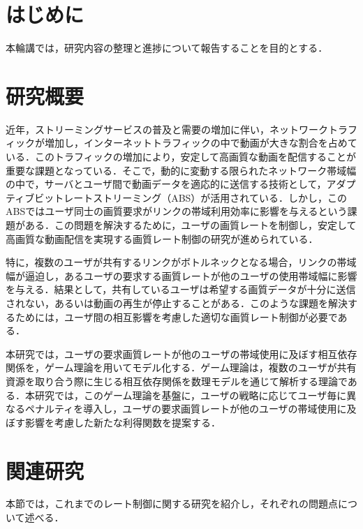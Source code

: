 \documentclass[rinkou,a4paper,uplatex]{ieicej}
\begin{document}
\maketitle
\section{はじめに}
本輪講では，研究内容の整理と進捗について報告することを目的とする．

\section{研究概要}
近年，ストリーミングサービスの普及と需要の増加に伴い，ネットワークトラフィックが増加し，インターネットトラフィックの中で動画が大きな割合を占めている．このトラフィックの増加により，安定して高画質な動画を配信することが重要な課題となっている．そこで，動的に変動する限られたネットワーク帯域幅の中で，サーバとユーザ間で動画データを適応的に送信する技術として，アダプティブビットレートストリーミング（ABS）が活用されている．しかし，このABSではユーザ同士の画質要求がリンクの帯域利用効率に影響を与えるという課題がある．この問題を解決するために，ユーザの画質レートを制御し，安定して高画質な動画配信を実現する画質レート制御の研究が進められている．

特に，複数のユーザが共有するリンクがボトルネックとなる場合，リンクの帯域幅が逼迫し，あるユーザの要求する画質レートが他のユーザの使用帯域幅に影響を与える．結果として，共有しているユーザは希望する画質データが十分に送信されない，あるいは動画の再生が停止することがある．このような課題を解決するためには，ユーザ間の相互影響を考慮した適切な画質レート制御が必要である．

本研究では，ユーザの要求画質レートが他のユーザの帯域使用に及ぼす相互依存関係を，ゲーム理論を用いてモデル化する．ゲーム理論は，複数のユーザが共有資源を取り合う際に生じる相互依存関係を数理モデルを通じて解析する理論である．本研究では，このゲーム理論を基盤に，ユーザの戦略に応じてユーザ毎に異なるペナルティを導入し，ユーザの要求画質レートが他のユーザの帯域使用に及ぼす影響を考慮した新たな利得関数を提案する．


\section{関連研究}
本節では，これまでのレート制御に関する研究を紹介し，それぞれの問題点について述べる．
\end{document}
